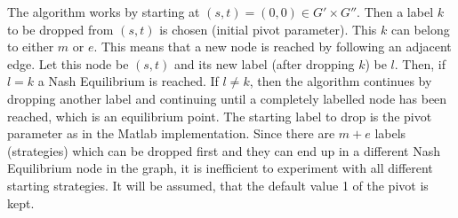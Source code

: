 The algorithm works by starting at $(s,t) = (0,0) \in G' \times G'' $. Then a label $k$ to be dropped from $(s,t)$ is chosen (initial pivot parameter). This $k$ can belong to either $m$ or $e$. This means that a new node is reached by following an adjacent edge. Let this node be $(s,t)$ and its new label (after dropping $k$) be $l$. Then, if $l=k$ a Nash Equilibrium is reached. If $l\neq k$, then the algorithm continues by dropping another label and continuing until a completely labelled node has been reached, which is an equilibrium point. The starting label to drop is the pivot parameter as in the Matlab implementation. Since there are $m+e$ labels (strategies) which can be dropped first and they can end up in a different Nash Equilibrium node in the graph, it is inefficient to experiment with all different starting strategies. It will be assumed, that the default value 1 of the pivot is kept.

